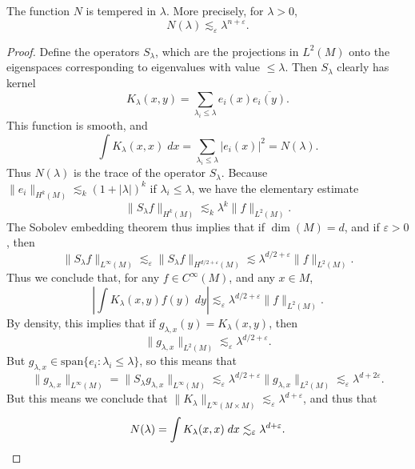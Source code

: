 \begin{theorem}
    The function $N$ is tempered in $\lambda$. More precisely, for $\lambda > 0$,
    \[ N(\lambda) \lesssim_\varepsilon \lambda^{n + \varepsilon}. \]
\end{theorem}
\begin{proof}
    Define the operators $S_\lambda$, which are the projections in $L^2(M)$ onto the eigenspaces corresponding to eigenvalues with value $\leq \lambda$. Then $S_\lambda$ clearly has kernel
    \[ K_\lambda(x,y) = \sum_{\lambda_i \leq \lambda} e_i(x) \overline{e_i(y)}. \]
    This function is smooth, and
    \[ \int K_\lambda(x,x)\; dx = \sum_{\lambda_i \leq \lambda} |e_i(x)|^2 = N(\lambda). \]    
    Thus $N(\lambda)$ is the trace of the operator $S_\lambda$. Because $\| e_i \|_{H^k(M)} \lesssim_k (1 + |\lambda|)^k$ if $\lambda_i \leq \lambda$, we have the elementary estimate
    \[ \| S_\lambda f \|_{H^k(M)} \lesssim_k \lambda^k \| f \|_{L^2(M)}. \]
    The Sobolev embedding theorem thus implies that if $\dim(M) = d$, and if $\varepsilon > 0$, then
    \[ \| S_\lambda f \|_{L^\infty(M)} \lesssim_\varepsilon \| S_\lambda f \|_{H^{d/2 + \varepsilon}(M)} \lesssim \lambda^{d/2 + \varepsilon} \| f \|_{L^2(M)}. \]
    Thus we conclude that, for any $f \in C^\infty(M)$, and any $x \in M$,
    \[ \left| \int K_\lambda(x,y) f(y)\; dy \right| \lesssim_\varepsilon \lambda^{d/2 + \varepsilon} \| f \|_{L^2(M)}. \]
    By density, this implies that if $g_{\lambda,x}(y) = K_\lambda(x,y)$, then
    \[ \| g_{\lambda,x} \|_{L^2(M)} \lesssim_\varepsilon \lambda^{d/2 + \varepsilon}. \]
    But $g_{\lambda,x} \in \text{span} \{ e_i: \lambda_i \leq \lambda \}$, so this means that
    \[ \| g_{\lambda,x} \|_{L^\infty(M)} = \| S_\lambda g_{\lambda,x} \|_{L^\infty(M)} \lesssim_\varepsilon \lambda^{d/2 + \varepsilon} \| g_{\lambda,x} \|_{L^2(M)} \lesssim_\varepsilon \lambda^{d + 2 \varepsilon}. \]
    But this means we conclude that $\| K_\lambda \|_{L^\infty(M \times M)} \lesssim_\varepsilon \lambda^{d + \varepsilon}$, and thus that
    \[ N(\lambda) = \int K_\lambda(x,x)\; dx \lesssim_\varepsilon \lambda^{d + \varepsilon}. \qedhere \]
\end{proof}

